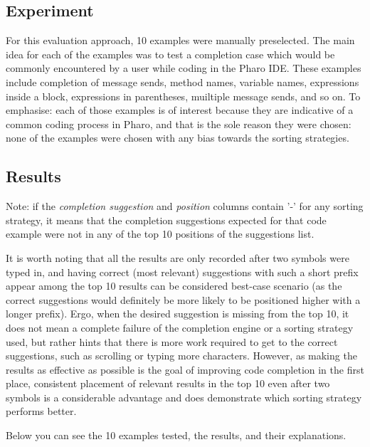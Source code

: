 \subsection{Experiment}
For this evaluation approach, 10 examples were manually preselected. The main idea for each of the examples was to test a completion case which would be commonly encountered by a user while coding in the Pharo IDE. These examples include completion of message sends, method names, variable names, expressions inside a block, expressions in parentheses, muiltiple message sends, and so on. To emphasise: each of those examples is of interest because they are indicative of a common coding process in Pharo, and that is the sole reason they were chosen: none of the examples were chosen with any bias towards the sorting strategies. 

\subsection{Results}
Note: if the \textit{completion suggestion} and \textit{position} columns contain '-' for any sorting strategy, it means that the completion suggestions expected for that code example were not in any of the top 10 positions of the suggestions list.

It is worth noting that all the results are only recorded after two symbols were typed in, and having correct (most relevant) suggestions with such a short prefix appear among the top 10 results can be considered best-case scenario (as the correct suggestions would definitely be more likely to be positioned higher with a longer prefix). Ergo, when the desired suggestion is missing from the top 10, it does not mean a complete failure of the completion engine or a sorting strategy used, but rather hints that there is more work required to get to the correct suggestions, such as scrolling or typing more characters. However, as making the results as effective as possible is the goal of improving code completion in the first place, consistent placement of relevant results in the top 10 even after two symbols is a considerable advantage and does demonstrate which sorting strategy performs better.

Below you can see the 10 examples tested, the results, and their explanations.

